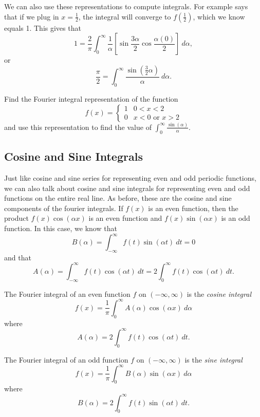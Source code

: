 \documentclass{ximera}
\begin{document}
We can also use these representations to compute integrals. For example  says that if we plug in $x = \frac{1}{2}$, the integral will converge to $f(\frac{1}{2})$, which we know equals 1. This gives that
\[ 
    1 =  \frac{2}{\pi} \int_0^\infty \frac{1}{\alpha} \left[ \sin \frac{3\alpha}{2} \cos\frac{\alpha(0)}{2} \right]\ d\alpha, 
\] 
or
\[ 
    \frac{\pi}{2} = \int_0^\infty \frac{\sin\left(\frac{3}{2}\alpha\right)}{\alpha}\ d\alpha. 
\]

\begin{exercise}
    Find the Fourier integral representation of the function
    \[ 
        f(x) = 
        \begin{cases}
            1 & 0 < x < 2 \\
            0 & x<0 \text{ or } x > 2
        \end{cases}
    \]
    and use this representation to find the value of $\int_0^\infty \frac{\sin(\alpha)}{\alpha}$.
\end{exercise} 

\subsection{Cosine and Sine Integrals}

Just like cosine and sine series for representing even and odd periodic functions, we can also talk about cosine and sine integrals for representing even and odd functions on the entire real line. As before, these are the cosine and sine components of the fourier integrals. If $f(x)$ is an even function, then the product $f(x)\cos(\alpha x)$ is an even function and $f(x) \sin(\alpha x)$ is an odd function. In this case, we know that
\[ 
    B(\alpha) =   \int_{-\infty}^\infty f(t) \sin\left(\alpha t\right)\ dt = 0 
\] 
and that 
\[ 
    A(\alpha) =  \int_{-\infty}^\infty f(t) \cos\left(\alpha t\right)\ dt = 2 \int_0^\infty f(t) \cos\left(\alpha t\right)\ dt. 
\]

\begin{theorem}
    The Fourier integral of an even function $f$ on $(-\infty, \infty)$ is the \emph{cosine integral}
    \[ 
        f(x) = \frac{1}{\pi} \int_0^\infty A(\alpha) \cos(\alpha x)\ d\alpha 
    \] 
    where
    \[ 
        A(\alpha) = 2\int_0^\infty f(t) \cos(\alpha t)\ dt. 
    \]
    
    The Fourier integral of an odd function $f$ on $(-\infty, \infty)$ is the \emph{sine integral}
    \[ 
        f(x) = \frac{1}{\pi} \int_0^\infty B(\alpha) \sin(\alpha x)\ d\alpha 
    \] 
    where
    \[ 
        B(\alpha) = 2\int_0^\infty f(t) \sin(\alpha t)\ dt. 
    \]
\end{theorem}
\end{document}
